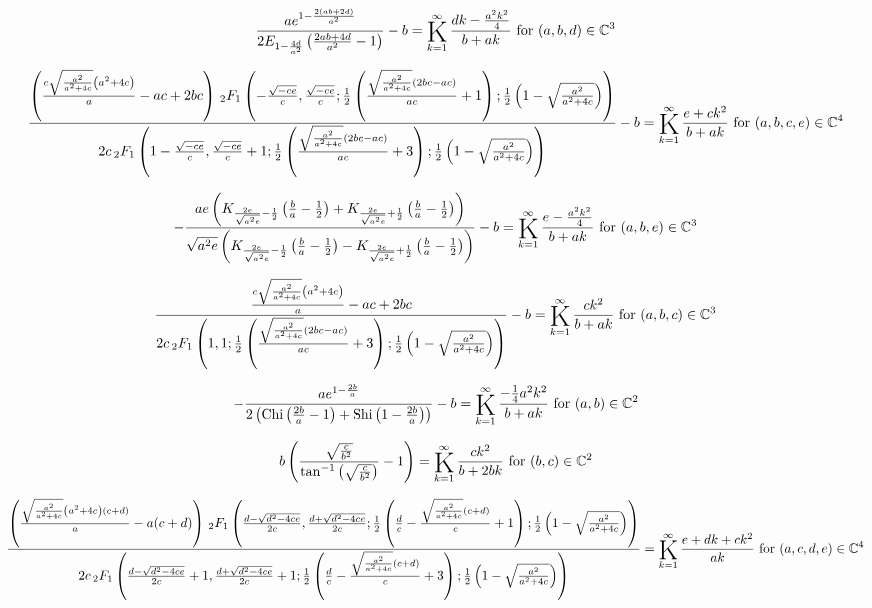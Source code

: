 \documentclass{article}
\newcommand{\bigK}{\mathop{\raisebox{-5pt}{\huge K}}}
\begin{document}
\[\frac{a e^{1-\frac{2 (a b+2 d)}{a^2}}}{2 E_{1-\frac{4 d}{a^2}}\left(\frac{2 a b+4 d}{a^2}-1\right)}-b=\bigK_{k=1}^{\infty}\frac{d k-\frac{a^2 k^2}{4}}{b+a k}\text{ for }(a,b,d)\in \mathbb{C}^3\] 

\[\frac{\left(\frac{c \sqrt{\frac{a^2}{a^2+4 c}} \left(a^2+4 c\right)}{a}-a c+2 b c\right) \, _2F_1\left(-\frac{\sqrt{-c e}}{c},\frac{\sqrt{-c e}}{c};\frac{1}{2} \left(\frac{\sqrt{\frac{a^2}{a^2+4 c}} (2 b c-a c)}{a c}+1\right);\frac{1}{2} \left(1-\sqrt{\frac{a^2}{a^2+4 c}}\right)\right)}{2 c \, _2F_1\left(1-\frac{\sqrt{-c e}}{c},\frac{\sqrt{-c e}}{c}+1;\frac{1}{2} \left(\frac{\sqrt{\frac{a^2}{a^2+4 c}} (2 b c-a c)}{a c}+3\right);\frac{1}{2} \left(1-\sqrt{\frac{a^2}{a^2+4 c}}\right)\right)}-b=\bigK_{k=1}^{\infty}\frac{e+c k^2}{b+a k}\text{ for }(a,b,c,e)\in \mathbb{C}^4\] 

\[-\frac{a e \left(K_{\frac{2 e}{\sqrt{a^2 e}}-\frac{1}{2}}\left(\frac{b}{a}-\frac{1}{2}\right)+K_{\frac{2 e}{\sqrt{a^2 e}}+\frac{1}{2}}\left(\frac{b}{a}-\frac{1}{2}\right)\right)}{\sqrt{a^2 e} \left(K_{\frac{2 e}{\sqrt{a^2 e}}-\frac{1}{2}}\left(\frac{b}{a}-\frac{1}{2}\right)-K_{\frac{2 e}{\sqrt{a^2 e}}+\frac{1}{2}}\left(\frac{b}{a}-\frac{1}{2}\right)\right)}-b=\bigK_{k=1}^{\infty}\frac{e-\frac{a^2 k^2}{4}}{b+a k}\text{ for }(a,b,e)\in \mathbb{C}^3\] 

\[\frac{\frac{c \sqrt{\frac{a^2}{a^2+4 c}} \left(a^2+4 c\right)}{a}-a c+2 b c}{2 c \, _2F_1\left(1,1;\frac{1}{2} \left(\frac{\sqrt{\frac{a^2}{a^2+4 c}} (2 b c-a c)}{a c}+3\right);\frac{1}{2} \left(1-\sqrt{\frac{a^2}{a^2+4 c}}\right)\right)}-b=\bigK_{k=1}^{\infty}\frac{c k^2}{b+a k}\text{ for }(a,b,c)\in \mathbb{C}^3\] 

\[-\frac{a e^{1-\frac{2 b}{a}}}{2 \left(\text{Chi}\left(\frac{2 b}{a}-1\right)+\text{Shi}\left(1-\frac{2 b}{a}\right)\right)}-b=\bigK_{k=1}^{\infty}\frac{-\frac{1}{4} a^2 k^2}{b+a k}\text{ for }(a,b)\in \mathbb{C}^2\] 

\[b \left(\frac{\sqrt{\frac{c}{b^2}}}{\tan ^{-1}\left(\sqrt{\frac{c}{b^2}}\right)}-1\right)=\bigK_{k=1}^{\infty}\frac{c k^2}{b+2 b k}\text{ for }(b,c)\in \mathbb{C}^2\] 

\[\frac{\left(\frac{\sqrt{\frac{a^2}{a^2+4 c}} \left(a^2+4 c\right) (c+d)}{a}-a (c+d)\right) \, _2F_1\left(\frac{d-\sqrt{d^2-4 c e}}{2 c},\frac{d+\sqrt{d^2-4 c e}}{2 c};\frac{1}{2} \left(\frac{d}{c}-\frac{\sqrt{\frac{a^2}{a^2+4 c}} (c+d)}{c}+1\right);\frac{1}{2} \left(1-\sqrt{\frac{a^2}{a^2+4 c}}\right)\right)}{2 c \, _2F_1\left(\frac{d-\sqrt{d^2-4 c e}}{2 c}+1,\frac{d+\sqrt{d^2-4 c e}}{2 c}+1;\frac{1}{2} \left(\frac{d}{c}-\frac{\sqrt{\frac{a^2}{a^2+4 c}} (c+d)}{c}+3\right);\frac{1}{2} \left(1-\sqrt{\frac{a^2}{a^2+4 c}}\right)\right)}=\bigK_{k=1}^{\infty}\frac{e+d k+c k^2}{a k}\text{ for }(a,c,d,e)\in \mathbb{C}^4\] 
\end{document}
